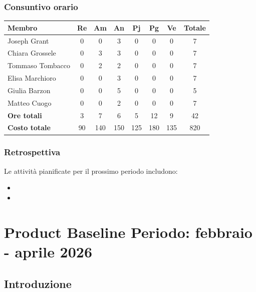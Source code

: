 \documentclass[11pt,a4paper]{article}
\begin{document}
\subsubsection{Consuntivo orario}
\begin{center}
    \begin{tabular}{|l|c|c|c|c|c|c|c|}
        \hline
        \textbf{Membro} & \textbf{Re} & \textbf{Am} & \textbf{An} & \textbf{Pj} & \textbf{Pg} & \textbf{Ve} & \textbf{Totale} \\
        \hline
        Joseph Grant & 0 & 0 & 3 & 0 & 0 & 0 & 7 \\
        \hline
        Chiara Grossele & 0 & 3 & 3 & 0 & 0 & 0 & 7 \\
        \hline
        Tommaso Tombacco & 0 & 2 & 2 & 0 & 0 & 0 & 7 \\
        \hline
        Elisa Marchioro & 0 & 0 & 3 & 0 & 0 & 0 & 7 \\
        \hline
        Giulia Barzon & 0 & 0 & 5 & 0 & 0 & 0 & 5 \\
        \hline
        Matteo Cuogo & 0 & 0 & 2 & 0 & 0 & 0 & 7 \\
        \hline
        \textbf{Ore totali} & 3 & 7 & 6 & 5 & 12 & 9 & 42 \\
        \hline
        \textbf{Costo totale} & 90 & 140 & 150 & 125 & 180 & 135 & 820 \\
        \hline
    \end{tabular}
\end{center}

\subsubsection{Retrospettiva}
Le attività pianificate per il prossimo periodo includono:
\begin{itemize}
    \item 
    \item 
\end{itemize}


\newpage
\section{Product Baseline \textbf{Periodo: febbraio - aprile 2026}}

\subsection{Introduzione}
\end{document}
